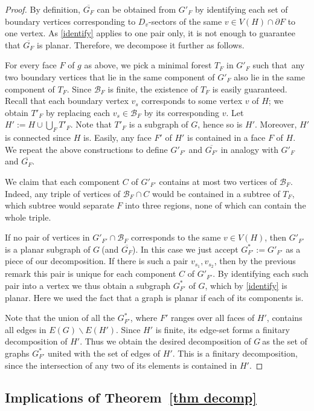 \documentclass{article}
\newcommand{\cb}{\ensuremath{\mathcal B}}
\newcommand{\sm}{\backslash}
\newcommand{\cls}[1]{\ensuremath{\overline{#1}}}
\newcommand{\g}{\ensuremath{G\ }}
\newcommand{\G}{\ensuremath{G}}
\newcommand{\Tr}[1]{Theorem~\ref{#1}}
\newcommand{\st}{such that}
\begin{document}
\begin{proof}
By definition, $\cls{G_F}$ can be obtained from $G'_F$ by identifying each set of boundary vertices corresponding to $D_v$-sectors of the same $v\in V(H) \cap \partial F$ to one vertex. As \eqref{identify} applies to one pair only, it is not enough to guarantee that $\cls{G_F}$ is planar. Therefore, we decompose it further as follows.

For every face $F$ of $g$ as above, we pick a minimal forest $T_F$ in  $G'_F$ \st\ any two boundary vertices  that lie in the same component of $G'_F$ also lie in the same component of $T_F$. Since $\cb_F$ is finite, the existence of $T_F$ is easily guaranteed. Recall that each boundary vertex $v_s$ corresponds to some vertex $v$ of $H$; we obtain $T'_F$ by replacing each $v_s\in \cb_F$ by its corresponding $v$.  Let $H':= H \cup \bigcup_F T'_F$. Note that $T'_F$ is a subgraph of \G, hence so is $H'$. Moreover, $H'$ is connected since $H$ is. Easily, any face $F'$ of $H'$ is contained in a face $F$ of $H$. We repeat the above constructions to define $G'_{F'}$ and $\cls{G_{F'}}$ in analogy with $G'_{F}$ and $\cls{G_{F}}$. 

We claim that each component $C$ of $G'_{F'}$ contains at most two vertices of $\cb_F$. Indeed, any triple of vertices of $\cb_F \cap C$ would be contained in a subtree of $T_F$, which subtree would separate $F$ into three regions, none of which can contain the whole triple. 

If no pair of vertices in $G'_{F'} \cap \cb_F$ corresponds to the same $v\in  V(H)$, then $G'_{F'}$ is a planar subgraph of \g (and $\cls{G_F}$).  In this case we just accept  $G^*_{F'}:= G'_{F'}$ as a piece of our decomposition. If there is such a pair $v_{s_1},v_{s_2}$, then by the previous remark this pair is unique for each component $C$ of $G'_{F'}$. By identifying each such pair into a vertex we thus obtain a subgraph $G^*_{F'}$ of \G, which by \eqref{identify} is planar. Here we used the fact that a graph is planar if each of its components is. 

Note that the union of all the $G^*_{F'}$, where $F'$ ranges over all faces of $H'$, contains all edges in $E(G) \sm E(H')$. Since $H'$ is finite, its edge-set forms a finitary decomposition of $H'$. Thus we obtain the desired decomposition of \g as  the set of graphs  $G^*_{F'}$ united with the set of edges of $H'$. This is a finitary decomposition, since the intersection of any two of its elements is contained in $H'$. 
\end{proof}

\subsection{Implications of \Tr{thm decomp}} \label{sec impl}
\end{document}
